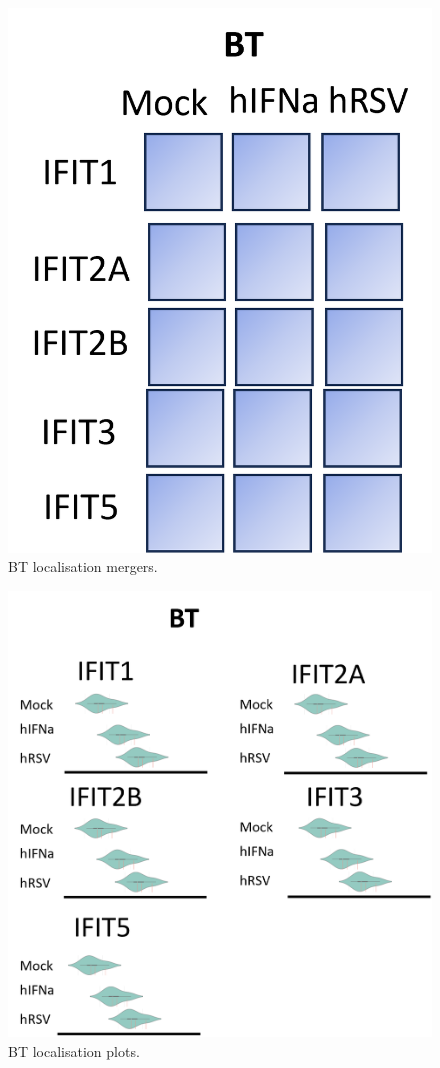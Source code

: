 \begin{figure}
    \centering
    \includegraphics[width=1\linewidth]{07. Chapter 2/Figs/04. Localisation/03. bt merges.png}
    \caption[BT localisation mergers.]{BT localisation mergers.}
    \label{BTlocalisation mergers.}
\end{figure}


\begin{figure}
    \centering
    \includegraphics[width=1\linewidth]{07. Chapter 2/Figs/04. Localisation/04. bt plots.png}
    \caption[BT localisation plots.]{BT localisation plots.}
    \label{BT localisation plots.}
\end{figure}